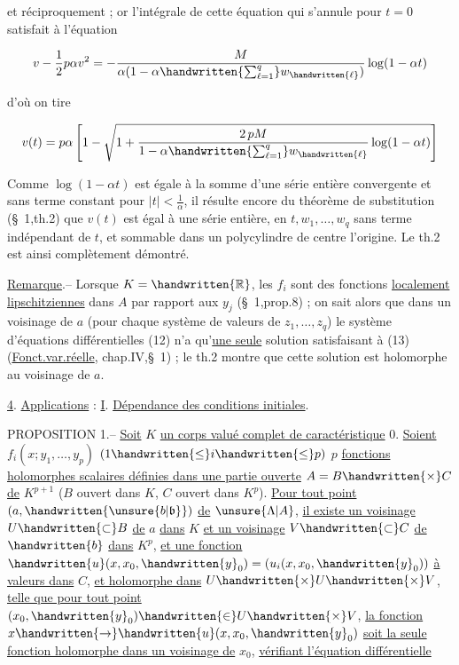 et réciproquement ; or l'intégrale de cette équation qui s'annule pour
$t=0$ satisfait à l'équation

\[
v-\frac12p\alpha v^2=-\frac{M}{\alpha(1-\alpha\handwritten{\sum_{\ell=1}^{q}}w_{\handwritten{\ell}})}\log(1-\alpha t)
\]

d'où on tire

\[
v(t)=p\alpha\left[1-\sqrt{1+\frac{2\,pM}{1-\alpha\handwritten{\sum_{\ell=1}^{q}}w_{\handwritten{\ell}}}\log(1-\alpha t)}\right]
\]

Comme $\log(1-\alpha t)$ est égale à la somme d'une série entière convergente
et sans terme constant pour $|t|<\frac1{\alpha}$, il résulte encore du théorème de
substitution (\S~1,th.2) que $v(t)$ est égal à une série entière, en
$t,w_1,\ldots,w_q$ sans terme indépendant de $t$, et sommable dans un polycylindre de centre l'origine. Le th.2 est ainsi complètement démontré.

\uline{Remarque}.-- Lorsque $K=\handwritten{\mathbb R}$, les $f_i$ sont des fonctions \uline{localement
lipschitziennes} dans $A$ par rapport aux $y_j$ (\S~1,prop.8) ; on sait
alors que dans un voisinage de $a$ (pour chaque système de valeurs
de $z_1,\ldots,z_q$) le système d'équations différentielles (12) n'a
qu'\uline{une seule} solution satisfaisant à (13) (\uline{Fonct.var.réelle},
chap.IV,\S~1) ; le th.2 montre que cette solution est holomorphe
au voisinage de $a$.

\uline{4}. \uline{Applications} : \uline{I}. \uline{Dépendance des conditions initiales}.

PROPOSITION 1.-- \uline{Soit} $K$ \uline{un corps valué complet de caractéristique} $0$.
\uline{Soient} $f_i(x;y_1,\ldots,y_p)$ $(1\handwritten{\leq}i\handwritten{\leq}p)$ $p$ \uline{fonctions holomorphes scalaires
définies dans une partie ouverte} $A=B\handwritten{\times} C$ \uline{de} $K^{p+1}$ ($B$ ouvert dans $K$, $C$
ouvert dans $K^p$). \uline{Pour tout point} $(a,\handwritten{\unsure{b|\mathfrak b}})$ \uline{de} $\unsure{\Lambda|A}$, \uline{il existe un voisinage}
$U\handwritten{\subset}B$ \uline{de} $a$ \uline{dans} $K$ \uline{et un voisinage} $V\handwritten{\subset} C$ \uline{de} $\handwritten{b}$ \uline{dans} $K^p$, \uline{et une
fonction} $\handwritten{u}(x,x_0,\handwritten{y}_0)=(u_i(x,x_0,\handwritten{y}_0))$ \uline{à valeurs dans} $C$, \uline{et holomorphe
dans} $U\handwritten{\times} U\handwritten{\times} V$, \uline{telle que pour tout point} $(x_0,\handwritten{y}_0)\handwritten{\in} U\handwritten{\times} V$, \uline{la fonction}
$x\handwritten{\to}\handwritten{u}(x,x_0,\handwritten{y}_0)$ \uline{soit la seule fonction holomorphe dans un voisinage
de} $x_0$, \uline{vérifiant l'équation différentielle}
